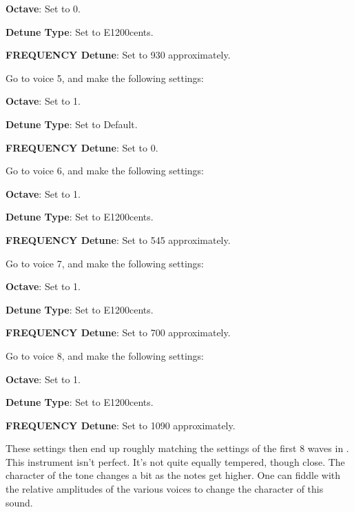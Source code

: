 \begin{enumber}
         \begin{enumber}
            \item \textbf{Octave}: Set to 0.
            \item \textbf{Detune Type}: Set to E1200cents.
            \item \textbf{FREQUENCY Detune}: Set to 930 approximately.
         \end{enumber}
      \item Go to voice 5, and make the following settings:
         \begin{enumber}
            \item \textbf{Octave}: Set to 1.
            \item \textbf{Detune Type}: Set to Default.
            \item \textbf{FREQUENCY Detune}: Set to 0.
         \end{enumber}
      \item Go to voice 6, and make the following settings:
         \begin{enumber}
            \item \textbf{Octave}: Set to 1.
            \item \textbf{Detune Type}: Set to E1200cents.
            \item \textbf{FREQUENCY Detune}: Set to 545 approximately.
         \end{enumber}
      \item Go to voice 7, and make the following settings:
         \begin{enumber}
            \item \textbf{Octave}: Set to 1.
            \item \textbf{Detune Type}: Set to E1200cents.
            \item \textbf{FREQUENCY Detune}: Set to 700 approximately.
         \end{enumber}
      \item Go to voice 8, and make the following settings:
         \begin{enumber}
            \item \textbf{Octave}: Set to 1.
            \item \textbf{Detune Type}: Set to E1200cents.
            \item \textbf{FREQUENCY Detune}: Set to 1090 approximately.
         \end{enumber}
   \end{enumber}

   These settings then end up roughly matching the settings of the first 8
   waves in .
   This instrument isn't perfect.  It's not quite equally tempered, though
   close.  The character of the tone changes a bit as the notes get higher.
   One can fiddle with the relative amplitudes of the various voices to
   change the character of this sound.

